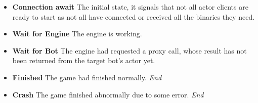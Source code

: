 \documentclass[11pt,a4paper,oneside]{report}
\begin{document}
		\begin{itemize}
			\item \textbf{Connection await} The initial state, it signals that not all actor clients are ready to start as not all have connected or received all the binaries they need.
			
			\item \textbf{Wait for Engine} The engine is working.

			\item \textbf{Wait for Bot} The engine had requested a proxy call, whose result has not been returned from the target bot's actor yet.
			
			\item \textbf{Finished} The game had finished normally. \emph{End}
			
			\item \textbf{Crash} The game finished abnormally due to some error. \emph{End}
		\end{itemize}
\end{document}
